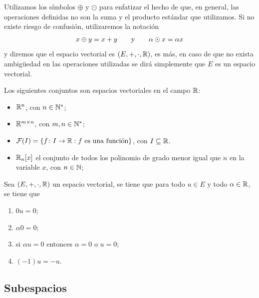 \documentclass[a4,11pt]{aleph-notas}
\begin{document}
\begin{advertencia}
    Utilizamos los símbolos $\oplus$ y $\odot$ para enfatizar el hecho de que, en general, las operaciones definidas no son la suma y el producto estándar que utilizamos. Si no existe riesgo de confusión, utilizaremos la notación
    \[
        x\oplus y = x+y
        \texty
        \alpha \odot x = \alpha x
    \]
    y diremos que el espacio vectorial es $(E,+,\cdot,\R)$, es más, en caso de que no exista ambigüedad en las operaciones utilizadas se dirá simplemente que $E$ es un espacio vectorial.
\end{advertencia}

\begin{teo}
    Los siguientes conjuntos son espacios vectoriales en el campo $\R$:
    \begin{itemize}
    \item
        $\R^n$, con $n\in \N^*$;
    \item
        $\Mat[\R]{m}{n}$, con $m,n\in \N^*$;
    \item
        $\mathcal{F}(I)=\{\func{f}{I}{\R}: f\text{ es una función}\}$, con $I\subseteq \R$.
    \item
        $\R_n[x]$ el conjunto de todos los polinomio de grado menor igual que $n$ en la variable $x$, con $n\in \N$;
    \end{itemize}
\end{teo}

\begin{teo}
    Sea $(E,+,\cdot,\R)$ un espacio vectorial, se tiene que para todo $u \in E$ y todo $\alpha \in \R$, se tiene que
    \begin{enumerate}
        \item $0u = 0$;
        \item $\alpha 0 = 0$;
        \item si $\alpha u=0$ entonces $\alpha  = 0$ o $u = 0$;
        \item $(-1) u = -u$.
    \end{enumerate}
\end{teo}

\subsection{Subespacios}
\end{document}
